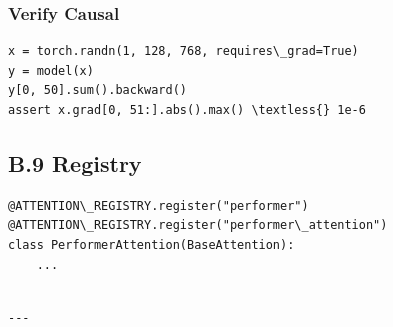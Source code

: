 \subsubsection{Verify Causal}

\begin{lstlisting}
x = torch.randn(1, 128, 768, requires\_grad=True)
y = model(x)
y[0, 50].sum().backward()
assert x.grad[0, 51:].abs().max() \textless{} 1e-6
\end{lstlisting}

\subsection{B.9 Registry}

\begin{lstlisting}
@ATTENTION\_REGISTRY.register("performer")
@ATTENTION\_REGISTRY.register("performer\_attention")
class PerformerAttention(BaseAttention):
    ...
\end{lstlisting}
\begin{lstlisting}

---
\end{lstlisting}